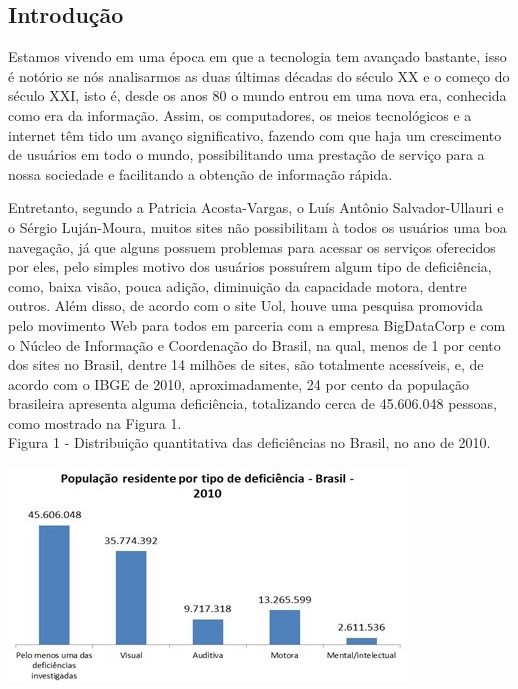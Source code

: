 \documentclass[a4paper]{article}
\begin{document}
\begin{titlepage}
	\begin{center}
		\tableofcontents
	\end{center}
\end{titlepage}
\begin{titlepage}
\section{Introdução}
\fontsize{12pt}{0pt}\selectfont
Estamos vivendo em uma época em que a tecnologia tem avançado bastante, isso é notório se nós analisarmos as duas últimas décadas do século XX e o começo do século XXI, isto é, desde os anos 80 o mundo entrou em uma nova era, conhecida como era da informação. Assim, os computadores, os meios tecnológicos e a internet têm tido um avanço significativo, fazendo com que haja um crescimento de usuários em todo o mundo, possibilitando uma prestação de serviço para a nossa sociedade e facilitando a obtenção de informação rápida.

Entretanto, segundo a Patricia Acosta-Vargas, o Luís Antônio Salvador-Ullauri e o Sérgio Luján-Moura, muitos sites não possibilitam à todos os usuários uma boa navegação, já que alguns possuem problemas para acessar os serviços oferecidos por eles, pelo simples motivo dos usuários possuírem algum tipo de deficiência, como, baixa visão, pouca adição, diminuição da capacidade motora, dentre outros. Além disso, de acordo com o site Uol, houve uma pesquisa promovida pelo movimento Web para todos em parceria com a empresa BigDataCorp e com o Núcleo de Informação e Coordenação do Brasil, na qual, menos de 1 por cento dos sites no Brasil, dentre 14 milhões de sites, são totalmente acessíveis, e, de acordo com o IBGE de 2010, aproximadamente, 24 por cento da população brasileira apresenta alguma deficiência, totalizando cerca de 45.606.048 pessoas, como mostrado na Figura 1.\\[0.5cm]

Figura 1 - Distribuição quantitativa das deficiências no Brasil, no ano de 2010.\\
\begin{center}
	\parbox{10cm}{\includegraphics[scale=0.7]{IBGE-Deficiência.jpg}} \\
\end{center}


\end{titlepage}
\end{document}

